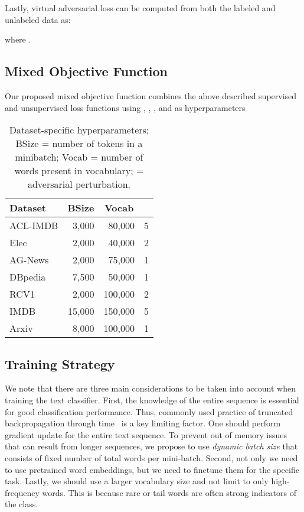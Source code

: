 \documentclass[letterpaper]{article}
\newcommand{\citep}{\cite}
\begin{document}
Lastly, virtual adversarial loss can be computed from both the labeled and unlabeled data as:

where .

\subsection{Mixed Objective Function}
Our proposed mixed objective function combines the above described supervised and unsupervised loss functions using , , , and  as hyperparameters


\begin{table}[b]
\small
\centering
\begin{tabular}{@{}l | r r r@{}}
 \toprule
 \textbf{Dataset} & \multicolumn{1}{c}{\textbf{BSize}} & \multicolumn{1}{c}{\textbf{Vocab}} &  \\
 \midrule
 ACL-IMDB & 3,000 & 80,000 & 5 \\
 Elec & 2,000 & 40,000 & 2 \\
 AG-News & 2,000 & 75,000 & 1 \\
 DBpedia & 7,500 & 50,000 & 1 \\
 RCV1 & 2,000 & 100,000 & 2 \\
 IMDB & 15,000 & 150,000 & 5 \\
 Arxiv & 8,000 & 100,000 & 1 \\
 \bottomrule
 \end{tabular}
\caption{Dataset-specific hyperparameters; BSize = number of tokens in a minibatch; Vocab = number of words present in vocabulary;  = adversarial perturbation.}
\label{table:hyperparameters}
\end{table}

\subsection{Training Strategy}
We note that there are three main considerations to be taken into account when training the text classifier.
First, the knowledge of the entire sequence is essential for good classification performance. Thus, commonly used practice of truncated backpropagation through time~\citep{werbos1988generalization} is a key limiting factor. One should perform gradient update for the entire text sequence. To prevent out of memory issues that can result from longer sequences, we propose to use \emph{dynamic batch size} that consists of fixed number of total words per mini-batch. Second, not only we need to use pretrained word embeddings, but we need to finetune them for the specific task. Lastly, we should use a larger vocabulary size and not limit to only high-frequency words. This is because rare or tail words are often strong indicators of the class.
\end{document}
